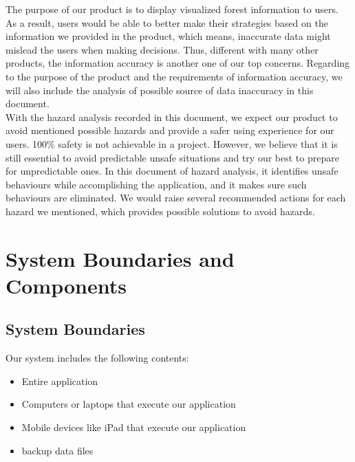 \documentclass{article}
\begin{document}
\noindent The purpose of our product is to display visualized 
forest information to users. As a result, users would be able to better make their
strategies based on the information we provided in the product, which means,
inaccurate data might mislead the users when making decisions. Thus, different
with many other products, the information accuracy is another one of our top
concerns. Regarding to the purpose of the product and the requirements of
information accuracy, we will also include the analysis of possible source of data
inaccuracy in this document. \\

\noindent With the hazard analysis recorded in this document, we expect our
product to avoid mentioned possible hazards and provide a safer using experience
for our users. 100\% safety is not achievable in a project. However, we believe
that it is still essential to avoid predictable unsafe situations and try our best
to prepare for unpredictable ones. In this document of hazard analysis, it
identifies unsafe behaviours while accomplishing the application, and it makes
sure such behaviours are eliminated. We would raise several recommended actions
for each hazard we mentioned, which provides possible solutions to avoid hazards. 

\newpage

\section{System Boundaries and Components}
\subsection{System Boundaries}
Our system includes the following contents:
\begin{itemize}
    \item Entire application
    \item Computers or laptops that execute our application
    \item Mobile devices like iPad that execute our application
    \item backup data files
\end{itemize}
\end{document}
